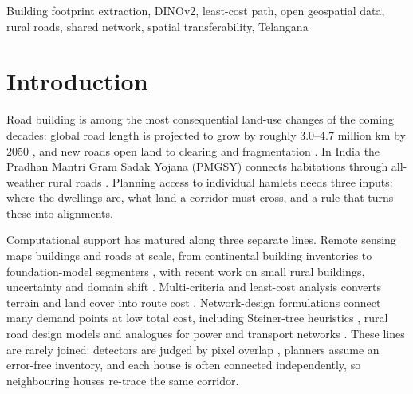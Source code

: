 \documentclass[journal]{IEEEtran}
\begin{document}
\begin{IEEEkeywords}
Building footprint extraction, DINOv2, least-cost path, open geospatial data, rural roads, shared network, spatial transferability, Telangana
\end{IEEEkeywords}
\IEEEpeerreviewmaketitle

\section{Introduction}

Road building is among the most consequential land-use changes of the coming decades: global road length is projected to grow by roughly 3.0--4.7 million km by 2050 \cite{meijer2018global}, and new roads open land to clearing and fragmentation \cite{laurance2014global}. In India the Pradhan Mantri Gram Sadak Yojana (PMGSY) connects habitations through all-weather rural roads \cite{pmgsy}. Planning access to individual hamlets needs three inputs: where the dwellings are, what land a corridor must cross, and a rule that turns these into alignments.

Computational support has matured along three separate lines. Remote sensing maps buildings and roads at scale, from continental building inventories \cite{sirko2021openbuildings} to foundation-model segmenters \cite{oquab2023dinov2}, with recent work on small rural buildings, uncertainty and domain shift \cite{r62,r63,r64,r65,r66,r67,r68,r69,r70}. Multi-criteria and least-cost analysis converts terrain and land cover into route cost \cite{r06,r53,r54,collischonn2000lcp}. Network-design formulations connect many demand points at low total cost, including Steiner-tree heuristics \cite{kou1981steiner,mehlhorn1988steiner,hwang1992steiner,r51}, rural road design models \cite{r41,r43,r44} and analogues for power and transport networks \cite{r45,r46,r47,r50}. These lines are rarely joined: detectors are judged by pixel overlap \cite{r01}, planners assume an error-free inventory, and each house is often connected independently, so neighbouring houses re-trace the same corridor.
\end{document}
